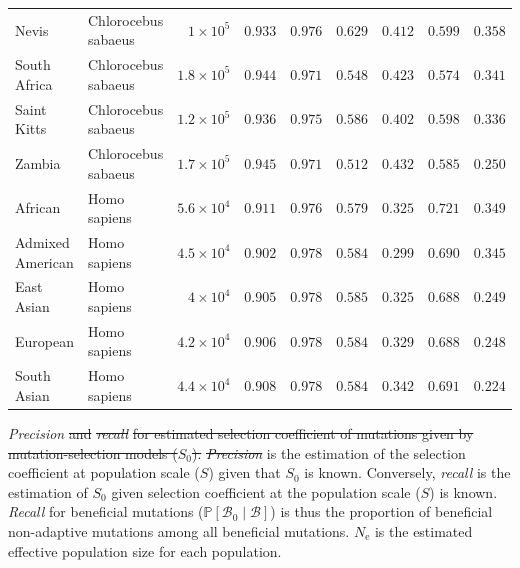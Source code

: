 \documentclass[10pt,letterpaper]{article}
\newcommand{\Ne}{N_{\text{e}}}
\newcommand{\proba}{\mathbb{P}}
\newcommand{\Sphy}{S_{0}}
\newcommand{\SphyBen}{\mathcal{B}_0}
\newcommand{\given}{\mid}
\newcommand{\Spop}{S}
\newcommand{\SpopBen}{\mathcal{B}}
\providecommand{\DIFdeltex}[1]{{\protect\color{red}\sout{#1}}}                      %
\providecommand{\DIFdelFL}[1]{\DIFdel{#1}} %
\providecommand{\DIFdelbeginFL}{} %
\providecommand{\DIFdelendFL}{} %
\providecommand{\DIFdel}[1]{\texorpdfstring{\DIFdeltex{#1}}{}} %
\newcommand{\DIFscaledelfig}{0.5}
\newlength{\DIFdelgraphicswidth} %
\newlength{\DIFdelgraphicsheight} %
\newcommand{\DIFdelincludegraphics}[2][]{%
\sbox{\DIFdelgraphicsbox}{\DIFOincludegraphics[#1]{#2}}%
\settoboxwidth{\DIFdelgraphicswidth}{\DIFdelgraphicsbox} %
\settoboxtotalheight{\DIFdelgraphicsheight}{\DIFdelgraphicsbox} %
\scalebox{\DIFscaledelfig}{%
\parbox[b]{\DIFdelgraphicswidth}{\usebox{\DIFdelgraphicsbox}\\[-\baselineskip] \rule{\DIFdelgraphicswidth}{0em}}\llap{\resizebox{\DIFdelgraphicswidth}{\DIFdelgraphicsheight}{%
\setlength{\unitlength}{\DIFdelgraphicswidth}%
\begin{picture}(1,1)%
\thicklines\linethickness{2pt} %
{\color[rgb]{1,0,0}\put(0,0){\framebox(1,1){}}}%
{\color[rgb]{1,0,0}\put(0,0){\line( 1,1){1}}}%
{\color[rgb]{1,0,0}\put(0,1){\line(1,-1){1}}}%
\end{picture}%
}\hspace*{3pt}}} %
} %
\DeclareRobustCommand{\DIFdelbeginFL}{\DIFOdelbeginFL \let\includegraphics\DIFdelincludegraphics} %
\DeclareRobustCommand{\DIFdelendFL}{\DIFOaddendFL \let\includegraphics\DIFOincludegraphics} %
\begin{document}
\begin{table}[!ht]
\begin{adjustwidth}{-2.25in}{0in}
\begin{tabular}{||l|l|r||r|r||r|r||r|r||}
\rowcolor{LIGHTGREY} Nevis & Chlorocebus sabaeus & $ 1\times 10^{5}$ & $ 0.933$ & $ 0.976$ & $ 0.629$ & $ 0.412$ & $ 0.599$ & $ 0.358$ \\
\rowcolor{LIGHTGREY} South Africa & Chlorocebus sabaeus & $1.8\times 10^{5}$ & $ 0.944$ & $ 0.971$ & $ 0.548$ & $ 0.423$ & $ 0.574$ & $ 0.341$ \\
\rowcolor{LIGHTGREY} Saint Kitts & Chlorocebus sabaeus & $1.2\times 10^{5}$ & $ 0.936$ & $ 0.975$ & $ 0.586$ & $ 0.402$ & $ 0.598$ & $ 0.336$ \\
\rowcolor{LIGHTGREY} Zambia & Chlorocebus sabaeus & $1.7\times 10^{5}$ & $ 0.945$ & $ 0.971$ & $ 0.512$ & $ 0.432$ & $ 0.585$ & $ 0.250$ \\
African & Homo sapiens & $5.6\times 10^{4}$ & $ 0.911$ & $ 0.976$ & $ 0.579$ & $ 0.325$ & $ 0.721$ & $ 0.349$ \\
Admixed American & Homo sapiens & $4.5\times 10^{4}$ & $ 0.902$ & $ 0.978$ & $ 0.584$ & $ 0.299$ & $ 0.690$ & $ 0.345$ \\
East Asian & Homo sapiens & $ 4\times 10^{4}$ & $ 0.905$ & $ 0.978$ & $ 0.585$ & $ 0.325$ & $ 0.688$ & $ 0.249$ \\
European & Homo sapiens & $4.2\times 10^{4}$ & $ 0.906$ & $ 0.978$ & $ 0.584$ & $ 0.329$ & $ 0.688$ & $ 0.248$ \\
South Asian & Homo sapiens & $4.4\times 10^{4}$ & $ 0.908$ & $ 0.978$ & $ 0.584$ & $ 0.342$ & $ 0.691$ & $ 0.224$ \\
\bottomrule
\end{tabular}
\normalsize
\begin{flushleft} \textit{Precision} \DIFdelbeginFL \DIFdelFL{and }\textit{\DIFdelFL{recall}} %
\DIFdelFL{for estimated selection coefficient of mutations given by mutation-selection models ($\Sphy$).
}\textit{\DIFdelFL{Precision}} %
\DIFdelendFL is the estimation of the selection coefficient at population scale ($\Spop$) given that $\Sphy$ is known.
Conversely, \textit{recall} is the estimation of $\Sphy$ given selection coefficient at the population scale ($\Spop$) is known.
\textit{Recall} for beneficial mutations ($\proba [\SphyBen \given \SpopBen]$) is thus the proportion of beneficial non-adaptive mutations among all beneficial mutations.
$\Ne$ is the estimated effective population size for each population.
\end{flushleft}
\label{table:proba}
\end{adjustwidth}
\end{table}
\end{document}
